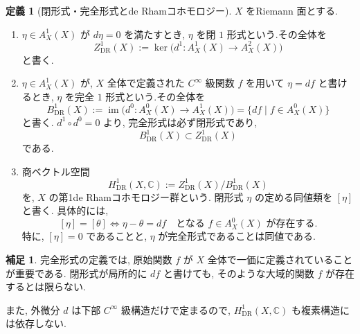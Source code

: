 \documentclass[dvipdfmx,a4paper,11pt]{article} %
\newcommand{\C}{\mathbb{C}}
\theoremstyle{definition}
\numberwithin{equation}{section}
\newtheorem{dfn}[thm]{定義}
\newtheorem{rem}[thm]{補足}
\begin{document}
\begin{dfn}[閉形式・完全形式とde Rhamコホモロジー]\label{O-M104}
$X$ をRiemann 面とする.
\begin{enumerate}
\item
$\eta\in A_X^1(X)$ が $d\eta=0$ を満たすとき, 
$\eta$ を閉 $1$ 形式という.その全体を
\[
Z^1_{\mathrm{DR}}(X)
:=\ker\bigl(d^1:A_X^1(X)\to A_X^2(X)\bigr)
\]
と書く.

\item
$\eta\in A_X^1(X)$ が, $X$ 全体で定義された
$C^\infty$ 級関数 $f$ を用いて $\eta=df$ と書けるとき, 
$\eta$ を完全 $1$ 形式という.その全体を
\[
B^1_{\mathrm{DR}}(X)
:=\operatorname{im}\bigl(d^0:A_X^0(X)\to A_X^1(X)\bigr)
=\{df\mid f\in A_X^0(X)\}
\]
と書く.
$d^1\circ d^0=0$ より, 完全形式は必ず閉形式であり, 
\[
B^1_{\mathrm{DR}}(X)\subset Z^1_{\mathrm{DR}}(X)
\]
である.

\item
商ベクトル空間
\[
H^1_{\mathrm{DR}}(X,\C)
:=Z^1_{\mathrm{DR}}(X)/B^1_{\mathrm{DR}}(X)
\]
を, $X$ の第1de Rhamコホモロジー群という.
閉形式 $\eta$ の定める同値類を $[\eta]$ と書く.
具体的には, 
\[
[\eta]=[\theta]
\iff
\eta-\theta=df
\quad\text{となる }f\in A_X^0(X)\text{ が存在する}.
\]
特に, $[\eta]=0$ であることと, $\eta$ が完全形式であることは同値である.
\end{enumerate}
\end{dfn}

\begin{rem}
完全形式の定義では, 原始関数 $f$ が
$X$ 全体で一価に定義されていることが重要である.
閉形式が局所的に $df$ と書けても, 
そのような大域的関数 $f$ が存在するとは限らない.

また, 外微分 $d$ は下部 $C^\infty$ 級構造だけで定まるので, 
$H^1_{\mathrm{DR}}(X,\C)$ も複素構造には依存しない.
\end{rem}
\end{document}
